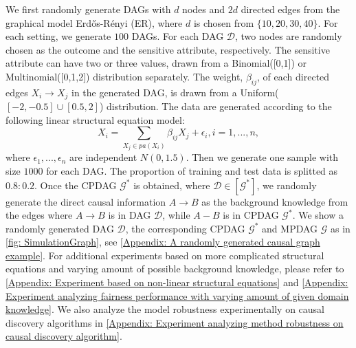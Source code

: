 \documentclass{article}
\begin{document}
We first randomly generate DAGs with $d$ nodes and $2d$ directed edges from the graphical model Erd{\H{o}}s-R{\'e}nyi (ER), where $d$ is chosen from $\{10,20,30,40\}$. For each setting, we generate $100$ DAGs. For each DAG $\mathcal{D}$, two nodes are randomly chosen as the outcome and the sensitive attribute, respectively. The sensitive attribute can have two or three values, drawn from a Binomial([0,1]) or Multinomial([0,1,2]) distribution separately. The weight, $\beta_{ij}$, of each directed edges $X_i \rightarrow X_j$ in the generated DAG, is drawn from a Uniform($[-2,-0.5]\cup [0.5,2]$) distribution. The data are generated according to the following linear structural equation model:
\begin{equation} \label{eq: linear structual equation model}
    X_i = \sum_{X_j \in pa(X_i)} \beta_{ij}X_j + \epsilon_i, i=1,...,n,
\end{equation}
where $\epsilon_1,...,\epsilon_n$ are independent $N(0,1.5)$. Then we generate one sample with size $1000$ for each DAG. The proportion of training and test data is splitted as $0.8:0.2$. Once the CPDAG $\mathcal{G^*}$ is obtained, where $\mathcal{D} \in [\mathcal{G^*}]$, we randomly generate the direct causal information $A \rightarrow B$ as the background knowledge from the edges where $A \rightarrow B$ is in DAG $\mathcal{D}$, while $A - B$ is in CPDAG $\mathcal{G^*}$. We show a randomly generated DAG $\mathcal{D}$, the corresponding CPDAG $\mathcal{G^*}$ and MPDAG $\mathcal{G}$ as in \cref{fig: SimulationGraph}, see \cref{Appendix: A randomly generated causal graph example}. For additional experiments based on 
more complicated structural equations and varying amount of possible background knowledge, please refer to \cref{Appendix: Experiment based on non-linear structural equations} and \cref{Appendix: Experiment analyzing fairness performance with varying amount of given domain knowledge}. We also analyze the model robustness experimentally on causal discovery algorithms in \cref{Appendix: Experiment analyzing method robustness on causal discovery algorithm}.
\end{document}
